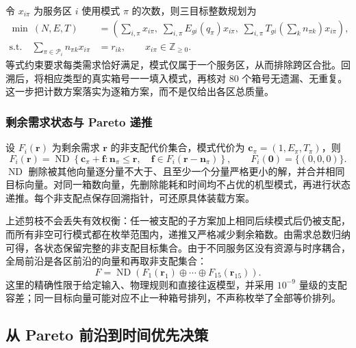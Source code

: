 令 $x_{i\pi}$ 为服务区 $i$ 使用模式 $\pi$ 的次数，则三目标整数规划为
\begin{align}
 \min\ (N,E,T)&=\left(\sum_{i,\pi}x_{i\pi},\;
 \sum_{i,\pi}E_{gi}(q_\pi)x_{i\pi},\;
 \sum_{i,\pi}T_{gi}\!\left(\sum_kn_{\pi k}\right)x_{i\pi}\right),\label{eq:q1-mip}\\
 \text{s.t.}\quad \sum_{\pi\in\mathcal P_i}n_{\pi k}x_{i\pi}&=r_{ik},\qquad
 x_{i\pi}\in\mathbb Z_{\ge0}.\label{eq:q1-cover}
\end{align}
等式约束要求每类需求恰好满足，模式仅属于一个服务区，从而排除跨区合批。回溯后，将相应类型的真实箱号一一填入模式，再核对 80 个箱号无遗漏、无重复。这一步把计数方案落实为逐箱方案，而不是仅给出各区总质量。

\subsubsection{剩余需求状态与 Pareto 递推}

设 $F_i(\boldsymbol r)$ 为剩余需求 $\boldsymbol r$ 的非支配代价集合，模式代价为 $\boldsymbol c_\pi=(1,E_\pi,T_\pi)$，则
\begin{equation}
 F_i(\boldsymbol r)=\operatorname{ND}\!\left\{
 \boldsymbol c_\pi+\boldsymbol f:
 \boldsymbol n_\pi\le\boldsymbol r,\quad
 \boldsymbol f\in F_i(\boldsymbol r-\boldsymbol n_\pi)
 \right\},\qquad F_i(\boldsymbol0)=\{(0,0,0)\}.
 \label{eq:q1-dp}
\end{equation}
$\operatorname{ND}$ 删除被其他向量逐分量不大于、且至少一个分量严格更小的解，并合并相同目标向量。对同一箱数向量，先删除能耗和时间均不占优的机型模式，再进行状态递推。每个非支配点保存回溯指针，可还原具体装载方案。

上述剪枝不会丢失有效权衡：任一被支配的子方案加上相同后续模式后仍被支配，而所有非空可行模式都在枚举范围内，递推又严格减少剩余箱数。由需求总数归纳可得，各状态保留完整的非支配目标集合。由于不同服务区没有资源与时序耦合，全局前沿是各区前沿的向量和再取非支配集合：
\begin{equation}
 F=\operatorname{ND}\left(F_1(\boldsymbol r_1)\oplus\cdots\oplus F_{15}(\boldsymbol r_{15})\right).
 \label{eq:q1-globalfront}
\end{equation}
这里的精确性限于给定输入、物理规则和直接往返模型，并采用 $10^{-9}$ 量级的支配容差；同一目标向量可能对应不止一种箱号排列，不声称枚举了全部等价排列。

\subsection{从 Pareto 前沿到时间优先决策}
